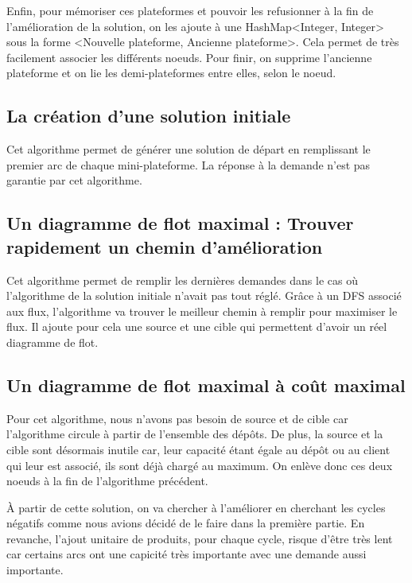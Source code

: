 \documentclass[a4paper,12pt]{article}
\begin{document}
Enfin, pour m\'emoriser ces plateformes et pouvoir les refusionner \`a la fin de l'am\'elioration de la solution, on les ajoute \`a une HashMap<Integer, Integer> sous la forme <Nouvelle plateforme, Ancienne plateforme>. Cela permet de tr\`es facilement associer les diff\'erents noeuds. Pour finir, on supprime l'ancienne plateforme et on lie les demi-plateformes entre elles, selon le noeud.

\subsection{La cr\'eation d'une solution initiale}

Cet algorithme permet de g\'en\'erer une solution de d\'epart en remplissant le premier arc de chaque mini-plateforme. La r\'eponse \`a la demande n'est pas garantie par cet algorithme.

\subsection{Un diagramme de flot maximal : Trouver rapidement un chemin d'am\'elioration}
Cet algorithme permet de remplir les derni\`eres demandes dans le cas o\`u l'algorithme de la solution initiale n'avait pas tout r\'egl\'e.
Gr\^ace \`a un DFS associ\'e aux flux, l'algorithme va trouver le meilleur chemin \`a remplir pour maximiser le flux.
Il ajoute pour cela une source et une cible qui permettent d'avoir un r\'eel diagramme de flot.

\subsection{Un diagramme de flot maximal \`a co\^ut maximal}

Pour cet algorithme, nous n'avons pas besoin de source et de cible car l'algorithme circule \`a partir de l'ensemble des d\'ep\^ots. De plus, la source et la cible sont d\'esormais inutile car, leur capacit\'e \'etant \'egale au d\'ep\^ot ou au client qui leur est associ\'e, ils sont d\'ej\`a charg\'e au maximum. On enl\`eve donc ces deux noeuds \`a la fin de l'algorithme pr\'ec\'edent.

\`A partir de cette solution, on va chercher \`a l'am\'eliorer en cherchant les cycles n\'egatifs comme nous avions d\'ecid\'e de le faire dans la premi\`ere partie. En revanche, l'ajout unitaire de produits, pour chaque cycle, risque d'\^etre tr\`es lent car certains arcs ont une capicit\'e tr\`es importante avec une demande aussi importante.
\end{document}
